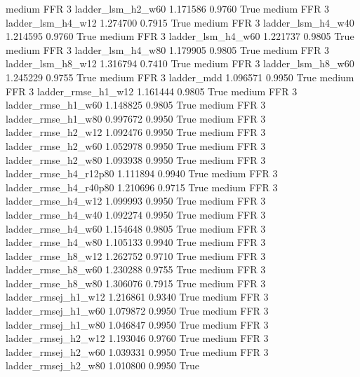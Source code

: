     medium      FFR                 3      ladder_lsm_h2_w60   1.171586      0.9760    True
    medium      FFR                 3      ladder_lsm_h4_w12   1.274700      0.7915    True
    medium      FFR                 3      ladder_lsm_h4_w40   1.214595      0.9760    True
    medium      FFR                 3      ladder_lsm_h4_w60   1.221737      0.9805    True
    medium      FFR                 3      ladder_lsm_h4_w80   1.179905      0.9805    True
    medium      FFR                 3      ladder_lsm_h8_w12   1.316794      0.7410    True
    medium      FFR                 3      ladder_lsm_h8_w60   1.245229      0.9755    True
    medium      FFR                 3             ladder_mdd   1.096571      0.9950    True
    medium      FFR                 3     ladder_rmse_h1_w12   1.161444      0.9805    True
    medium      FFR                 3     ladder_rmse_h1_w60   1.148825      0.9805    True
    medium      FFR                 3     ladder_rmse_h1_w80   0.997672      0.9950    True
    medium      FFR                 3     ladder_rmse_h2_w12   1.092476      0.9950    True
    medium      FFR                 3     ladder_rmse_h2_w60   1.052978      0.9950    True
    medium      FFR                 3     ladder_rmse_h2_w80   1.093938      0.9950    True
    medium      FFR                 3  ladder_rmse_h4_r12p80   1.111894      0.9940    True
    medium      FFR                 3  ladder_rmse_h4_r40p80   1.210696      0.9715    True
    medium      FFR                 3     ladder_rmse_h4_w12   1.099993      0.9950    True
    medium      FFR                 3     ladder_rmse_h4_w40   1.092274      0.9950    True
    medium      FFR                 3     ladder_rmse_h4_w60   1.154648      0.9805    True
    medium      FFR                 3     ladder_rmse_h4_w80   1.105133      0.9940    True
    medium      FFR                 3     ladder_rmse_h8_w12   1.262752      0.9710    True
    medium      FFR                 3     ladder_rmse_h8_w60   1.230288      0.9755    True
    medium      FFR                 3     ladder_rmse_h8_w80   1.306076      0.7915    True
    medium      FFR                 3    ladder_rmsej_h1_w12   1.216861      0.9340    True
    medium      FFR                 3    ladder_rmsej_h1_w60   1.079872      0.9950    True
    medium      FFR                 3    ladder_rmsej_h1_w80   1.046847      0.9950    True
    medium      FFR                 3    ladder_rmsej_h2_w12   1.193046      0.9760    True
    medium      FFR                 3    ladder_rmsej_h2_w60   1.039331      0.9950    True
    medium      FFR                 3    ladder_rmsej_h2_w80   1.010800      0.9950    True
